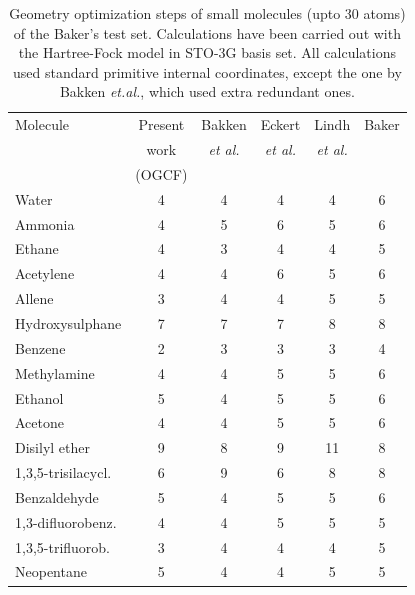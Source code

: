 \documentclass[prl,aps,twocolumn,showpacs,twocolumngrid,superbib]{revtex4}
\begin{document}
\begin{table}[h]
\caption{
Geometry optimization steps of small molecules (upto 30 atoms)
of the Baker's test set. Calculations have been carried out 
with the Hartree-Fock model in STO-3G basis set.
All calculations used standard primitive internal coordinates,
except the one by Bakken {\it et.al.}, which used extra redundant
ones.
}
\label{Bakers_test}
\begin{tabular}{lccccc}
\toprule
Molecule               & Present  & Bakken & Eckert  & Lindh &  Baker  \\
         & work & {\it{et al.}} & {\it{et al.}} & {\it{et al.}} &    \\
         &(OGCF) &  \cite{bakken} &  \cite{eckert} & \cite{lindh} &  \cite{bakerstest} \\
\colrule
Water                  &   4    &   4    &    4    &    4   &   6     \\
Ammonia                &   4    &   5    &    6    &    5   &   6     \\
Ethane                 &   4    &   3    &    4    &    4   &   5     \\
Acetylene              &   4    &   4    &    6    &    5   &   6     \\
Allene                 &   3    &   4    &    4    &    5   &   5     \\
Hydroxysulphane        &   7    &   7    &    7    &    8   &   8     \\
Benzene                &   2    &   3    &    3    &    3   &   4     \\
Methylamine            &   4    &   4    &    5    &    5   &   6     \\
Ethanol                &   5    &   4    &    5    &    5   &   6     \\
Acetone                &   4    &   4    &    5    &    5   &   6     \\
Disilyl ether          &   9    &   8    &    9    &   11   &   8     \\
1,3,5-trisilacycl.     &   6    &   9    &    6    &    8   &   8     \\
Benzaldehyde           &   5    &   4    &    5    &    5   &   6     \\
1,3-difluorobenz.      &   4    &   4    &    5    &    5   &   5     \\
1,3,5-trifluorob.      &   3    &   4    &    4    &    4   &   5     \\
Neopentane             &   5    &   4    &    4    &    5   &   5     \\

\end{tabular}
\end{table}
\end{document}

